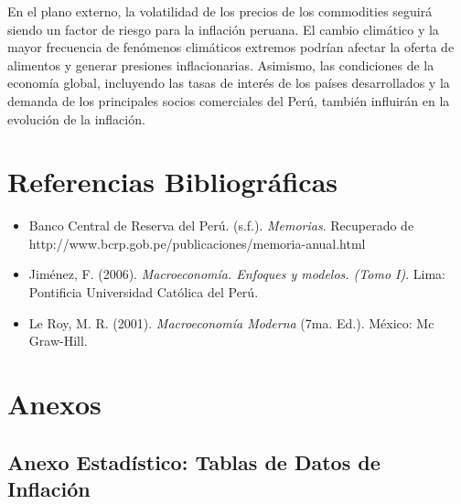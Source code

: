 \documentclass[
  stu,
  floatsintext,
  longtable,
  a4paper,
  nolmodern,
  notxfonts,
  notimes,
  12pt,
  colorlinks=true,linkcolor=blue,citecolor=blue,urlcolor=blue]{apa7}
\providecommand{\tightlist}{%
  \setlength{\itemsep}{0pt}\setlength{\parskip}{0pt}}
\begin{document}
En el plano externo, la volatilidad de los precios de los commodities
seguirá siendo un factor de riesgo para la inflación peruana. El cambio
climático y la mayor frecuencia de fenómenos climáticos extremos podrían
afectar la oferta de alimentos y generar presiones inflacionarias.
Asimismo, las condiciones de la economía global, incluyendo las tasas de
interés de los países desarrollados y la demanda de los principales
socios comerciales del Perú, también influirán en la evolución de la
inflación.

\section{Referencias
Bibliográficas}\label{referencias-bibliogruxe1ficas}

\begin{itemize}
\tightlist
\item
  Banco Central de Reserva del Perú. (s.f.). \emph{Memorias}. Recuperado
  de http://www.bcrp.gob.pe/publicaciones/memoria-anual.html
\item
  Jiménez, F. (2006). \emph{Macroeconomía. Enfoques y modelos. (Tomo
  I)}. Lima: Pontificia Universidad Católica del Perú.
\item
  Le Roy, M. R. (2001). \emph{Macroeconomía Moderna} (7ma. Ed.). México:
  Mc Graw-Hill.
\end{itemize}

\appendix

\section{Anexos}\label{apx-anexos}

\subsection{Anexo Estadístico: Tablas de Datos de
Inflación}\label{anexo-estaduxedstico-tablas-de-datos-de-inflaciuxf3n}
\end{document}
